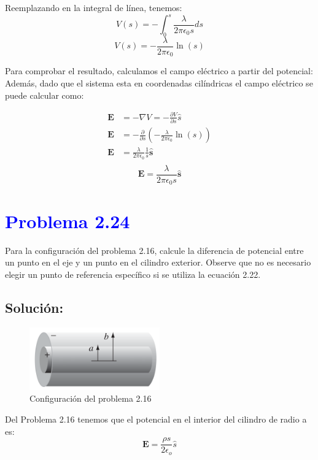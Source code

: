 \documentclass[12pt]{article}
\newcommand{\question}[1]{\textcolor{blue}{\textbf{#1}}}
\begin{document}
Reemplazando en la integral de línea, tenemos:
\[
    {V(s)} = -\int_{0}^{s} \frac{\lambda}{2\pi \epsilon_0 s} ds 
\]
\[
\boxed{{V(s)} =  -\frac{\lambda}{2\pi \epsilon_0} \ln(s) }
\]

Para comprobar el resultado, calculamos el campo eléctrico a partir del potencial:
Además, dado que el sistema esta en coordenadas cilíndricas el campo eléctrico se puede calcular como:

\begin{align*}
    \mathbf{E}  &= -\nabla V = -\frac{\partial V}{\partial s} \hat{s} \\
    \mathbf{E} &= -\frac{\partial}{\partial s} \left(-\frac{\lambda}{2\pi \epsilon_0} \ln(s) \right) \\
    \mathbf{E} &= \frac{\lambda}{2\pi \epsilon_0} \frac{1}{s} \hat{\mathbf{s}} \\
\end{align*}
\[
\boxed{\mathbf{E} = \frac{\lambda}{2\pi \epsilon_0 s} \hat{\mathbf{s}}}
\]

\section*{\question{ Problema 2.24}}Para la configuración del problema 2.16, calcule la diferencia de potencial entre un punto en el eje y un punto en el cilindro exterior. Observe que no es necesario elegir un punto de referencia específico si se utiliza la ecuación 2.22.
\subsection*{Solución:}

\begin{figure}[H]
    \centering
    \includegraphics[width=0.5\textwidth]{imagenes/problema_24.png}
    \caption*{\label{fig:problema_24}Configuración del problema 2.16}
\end{figure}


Del Problema 2.16 tenemos que el potencial en el interior del cilindro de radio a es:
\[
\mathbf{E} = \frac{\rho s}{2\epsilon_o }  \hat{s}
\]
\end{document}
